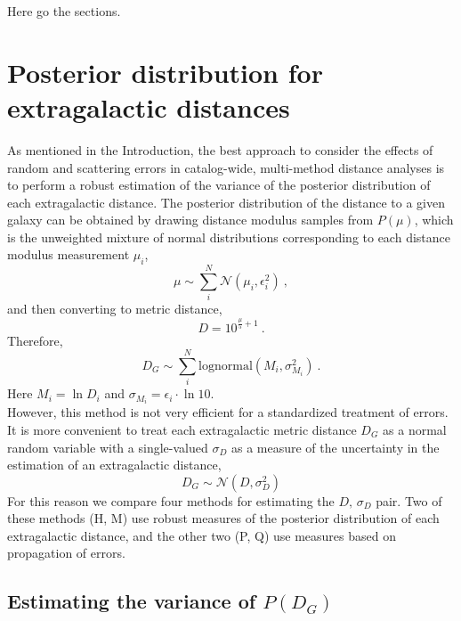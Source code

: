 \documentclass[a4paper,fleqn,usenatbib]{mnras}
\begin{document}

Here go the sections.






\section{Posterior distribution for extragalactic distances}
\label{sec:post} %
 
As mentioned in the Introduction, the best approach to consider the effects of random and scattering errors in catalog-wide, multi-method distance analyses is to perform a robust estimation of the variance of the posterior distribution of each extragalactic distance. The posterior distribution of the distance to a given galaxy can be obtained by drawing distance modulus samples from $P(\mu)$, which is the unweighted mixture of normal distributions corresponding to each distance modulus measurement $\mu_i$,
\[\mu\sim\sum_i^N \mathcal{N}(\mu_i,\epsilon_i^2)\ ,\]
and then converting to metric distance,
\[D=10^{\frac{\mu}{5}+1}\ .\]
Therefore,
\[D_G\sim\sum_i^N\mathrm{lognormal}(M_i,\sigma_{M_i}^2)\ .\]
Here $M_i=\ln D_i$ and $\sigma_{M_i}=\epsilon_i\cdot\ln10$.\\

However, this method is not very efficient for a standardized treatment of errors. It is more convenient to treat each extragalactic metric distance $D_G$ as a normal random variable with a single-valued $\sigma_D$ as a measure of the uncertainty in the estimation of an extragalactic distance,
\[D_G\sim \mathcal{N}(D,\sigma_D^2)\]
For this reason we compare four methods for estimating the $D,\,\sigma_D$ pair. Two of these methods (H, M) use robust measures of the posterior distribution of each extragalactic distance, and the other two (P, Q) use measures based on propagation of errors.

\subsection{Estimating the variance of $P(D_G)$}
\label{sec:meth} 
\end{document}
